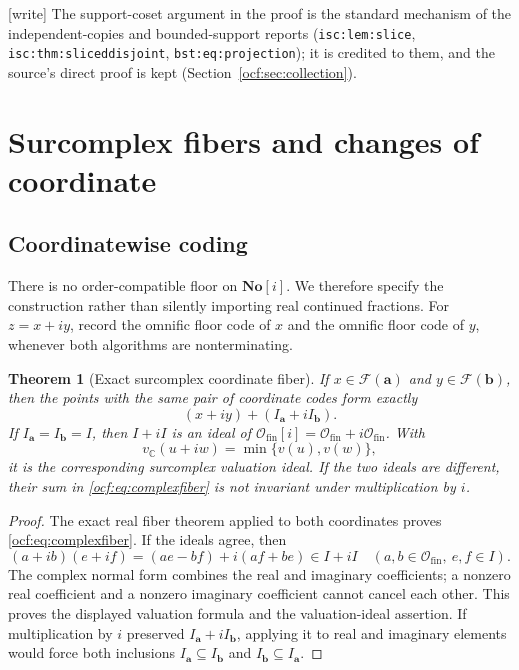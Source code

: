 \documentclass[11pt,a4paper]{article}
\numberwithin{equation}{section}
\newtheorem{theorem}{Theorem}[section]
\theoremstyle{definition}
\theoremstyle{remark}
\newcommand{\SC}{\mathbf{No}[i]}
\newcommand{\C}{\mathbb C}
\newcommand{\Ofin}{\mathcal O_{\mathrm{fin}}}%
\newcommand{\F}{\mathcal F}
\newcommand{\codea}{\boldsymbol a}
\newcommand{\codeb}{\boldsymbol b}
\newcommand{\lbl}[1]{\nolinkurl{#1}}%
\newcommand{\wtag}{\textup{[write]}}%
\begin{document}
\wtag{} The support-coset argument in the proof is the standard mechanism
of the independent-copies and bounded-support reports
(\lbl{isc:lem:slice}, \lbl{isc:thm:sliceddisjoint}, \lbl{bst:eq:projection});
it is credited to them, and the source's direct proof is kept
(Section~\ref{ocf:sec:collection}).

\section{Surcomplex fibers and changes of coordinate}
\label{ocf:sec:complex}

\subsection{Coordinatewise coding}

There is no order-compatible floor on $\SC$. We therefore specify the
construction rather than silently importing real continued fractions.
For $z=x+iy$, record the omnific floor code of $x$ and the omnific floor
code of $y$, whenever both algorithms are nonterminating.

\begin{theorem}[Exact surcomplex coordinate fiber]\label{ocf:thm:complex}
If $x\in\F(\codea)$ and $y\in\F(\codeb)$, then the points with the same
pair of coordinate codes form exactly
\begin{equation}\label{ocf:eq:complexfiber}
 (x+iy)+(I_{\codea}+iI_{\codeb}).
\end{equation}
If $I_{\codea}=I_{\codeb}=I$, then $I+iI$ is an ideal of
$\Ofin[i]=\Ofin+i\Ofin$. With
\[
 v_\C(u+iw)=\min\{v(u),v(w)\},
\]
it is the corresponding surcomplex valuation ideal. If the two ideals
are different, their sum in \eqref{ocf:eq:complexfiber} is not invariant under
multiplication by $i$.
\end{theorem}
\begin{proof}
The exact real fiber theorem applied to both coordinates proves
\eqref{ocf:eq:complexfiber}. If the ideals agree, then
\[
 (a+ib)(e+if)=(ae-bf)+i(af+be)\in I+iI
 \quad(a,b\in\Ofin,\ e,f\in I).
\]
The complex normal form combines the real and imaginary coefficients;
a nonzero real coefficient and a nonzero imaginary coefficient cannot
cancel each other. This proves the displayed valuation formula and the
valuation-ideal assertion.
If multiplication by $i$ preserved $I_{\codea}+iI_{\codeb}$, applying it to
real and imaginary elements would force both inclusions
$I_{\codea}\subseteq I_{\codeb}$ and $I_{\codeb}\subseteq I_{\codea}$.
\end{proof}
\end{document}
